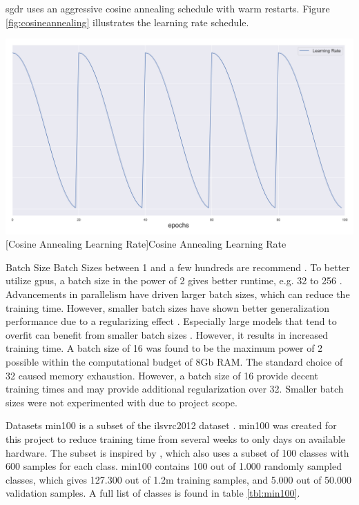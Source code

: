 \begin{enumdescript}
\begin{enumdescript}
		\gls{sgdr} uses an aggressive cosine annealing schedule with warm restarts. Figure \ref{fig:cosineannealing} illustrates the learning rate schedule.
		
		\begin{minipage}[t]{\linewidth}
			\centering
			\includegraphics[width=.7\linewidth]{figures/lr.png}
			[Cosine Annealing Learning Rate]{Cosine Annealing Learning Rate} 
			\label{fig:cosineannealing}
		\end{minipage}
		
		\item[Batch Size] Batch Sizes between 1 and a few hundreds are recommend \cite{bengio_practical_2012}. To better utilize \gls{gpu}s, a batch size in the power of 2 gives better runtime, e.g. 32 to 256 \cite{goodfellow_deep_2016}. Advancements in parallelism \cite{dean_large_2012} have driven larger batch sizes, which can reduce the training time. However, smaller batch sizes have shown better generalization performance due to a regularizing effect \cite{masters_revisiting_nodate}. Especially large models that tend to overfit can benefit from smaller batch sizes \cite{goodfellow_deep_2016}. However, it results in increased training time.
		A batch size of 16 was found to be the maximum power of 2 possible within the computational budget of 8Gb RAM. The standard choice of 32 caused memory exhaustion. However, a batch size of 16 provide decent training times and may provide additional regularization over 32. Smaller batch sizes were not experimented with due to project scope.
		
		\item[Datasets] \gls{min100} is a subset of the \gls{ilsvrc2012} dataset \cite{russakovsky_imagenet_2015}. \gls{min100} was created for this project to reduce training time from several weeks to only days on available hardware. The subset is inspired by \cite{vinyals_matching_2016}, which also uses a subset of 100 classes with 600 samples for each class. \gls{min100} contains 100 out of 1.000 randomly sampled classes, which gives 127.300 out of 1.2m training samples, and 5.000 out of 50.000 validation samples. A full list of classes is found in table \ref{tbl:min100}. 
		

\end{enumdescript}
\end{enumdescript}
